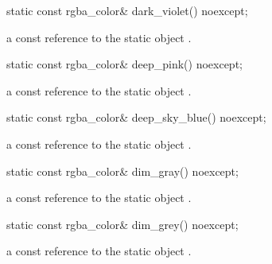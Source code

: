 \begin{itemdecl}
    static const rgba_color& dark_violet() noexcept;
\end{itemdecl}
\begin{itemdescr}
    \pnum
    \returns
    a const reference to the static  object .
\end{itemdescr}

\begin{itemdecl}
    static const rgba_color& deep_pink() noexcept;
\end{itemdecl}
\begin{itemdescr}
    \pnum
    \returns
    a const reference to the static  object .
\end{itemdescr}

\begin{itemdecl}
    static const rgba_color& deep_sky_blue() noexcept;
\end{itemdecl}
\begin{itemdescr}
    \pnum
    \returns
    a const reference to the static  object .
\end{itemdescr}

\begin{itemdecl}
    static const rgba_color& dim_gray() noexcept;
\end{itemdecl}
\begin{itemdescr}
    \pnum
    \returns
    a const reference to the static  object .
\end{itemdescr}

\begin{itemdecl}
    static const rgba_color& dim_grey() noexcept;
\end{itemdecl}
\begin{itemdescr}
    \pnum
    \returns
    a const reference to the static  object .
\end{itemdescr}

